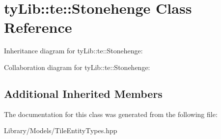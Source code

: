 \hypertarget{classty_lib_1_1te_1_1_stonehenge}{}\section{ty\+Lib\+:\+:te\+:\+:Stonehenge Class Reference}
\label{classty_lib_1_1te_1_1_stonehenge}


Inheritance diagram for ty\+Lib\+:\+:te\+:\+:Stonehenge\+:


Collaboration diagram for ty\+Lib\+:\+:te\+:\+:Stonehenge\+:
\subsection*{Additional Inherited Members}


The documentation for this class was generated from the following file\+:\begin{DoxyCompactItemize}
\item 
Library/\+Models/Tile\+Entity\+Types.\+hpp\end{DoxyCompactItemize}
